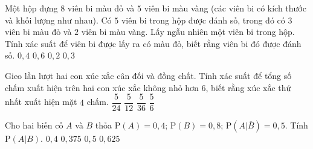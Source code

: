\begin{ex}%
	Một hộp đựng $8$ viên bi màu đỏ và $5$ viên bi màu vàng (các viên bi có kích thước và khối lượng như nhau). Có $5$ viên bi trong hộp được đánh số, trong đó có $3$ viên bi màu đỏ và $2$ viên bi màu vàng. Lấy ngẫu nhiên một viên bi trong hộp. Tính xác suất để viên bi được lấy ra có màu đỏ, biết rằng viên bi đó được đánh số.
	\choice
	{$0{,}4$}
	{\True $0{,}6$}
	{$0{,}2$}
	{$0{,}3$}
\end{ex}	


\begin{ex}%
	Gieo lần lượt hai con xúc xắc cân đối và đồng chất. Tính xác suất để tổng số chấm xuất hiện trên hai con xúc xắc không nhỏ hơn $6$, biết rằng xúc xắc thứ nhất xuất hiện mặt $4$ chấm.
	\choice
	{$\dfrac{5}{24}$}
	{$\dfrac{5}{12}$}
	{$\dfrac{5}{36}$}
	{\True $\dfrac{5}{6}$}
\end{ex}

\begin{ex}%
    Cho hai biến cố $A$ và $B$ thỏa $\mathrm{P}(A)=0{,}4$; $\mathrm{P}(B)=0{,}8$; $\mathrm{P}\left(A| \overline{B}\right)=0{,}5$. Tính $\mathrm{P}(A|B)$.
    \choice
    {$0{,}4$}
    {\True $0{,}375$}
    {$0{,}5$}
    {$0{,}625$}
\end{ex}


